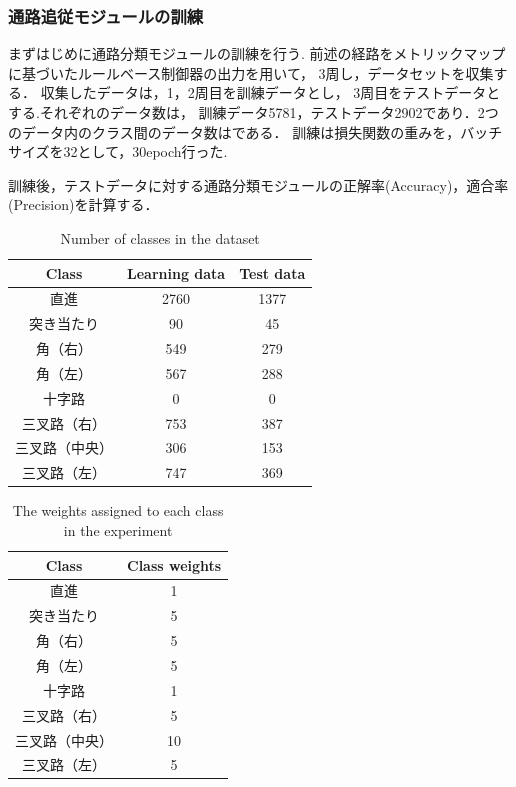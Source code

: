 \clearpage
\subsubsection{通路追従モジュールの訓練}
まずはじめに通路分類モジュールの訓練を行う.
前述の経路をメトリックマップに基づいたルールベース制御器の出力を用いて，
3周し，データセットを収集する．
収集したデータは，1，2周目を訓練データとし，
3周目をテストデータとする.それぞれのデータ数は，
訓練データ5781，テストデータ2902であり．2つのデータ内のクラス間のデータ数はである．
訓練は損失関数の重みを，バッチサイズを32として，30epoch行った.

訓練後，テストデータに対する通路分類モジュールの正解率{(Accuracy)}，適合率{(Precision)}を計算する．
\begin{table}[htbp]
    \centering
    \caption{Number of classes in the dataset}\label{tab:dataset}
    \begin{tabular}{c|c|c}
    \hline
    Class & Learning data &Test data        \\
    \hline
    直進   & 2760 & 1377\\
    突き当たり   & 90 & 45 \\
    角（右） & 549 & 279 \\
    角（左）& 567 & 288 \\
    十字路 & 0 & 0 \\
    三叉路（右）& 753 & 387 \\
    三叉路（中央）& 306 & 153 \\
    三叉路（左） & 747 & 369 \\
    \hline
    \end{tabular}
\end{table}

\begin{table}[htbp]
    \centering
    \caption{The weights assigned to each class in the experiment}\label{tab:cost}
    \begin{tabular}{c|c}
    \hline
    Class & Class weights         \\
    \hline
    直進   & 1\\
    突き当たり   & 5\\
    角（右） & 5\\
    角（左）& 5 \\
    十字路 & 1  \\
    三叉路（右）& 5  \\
    三叉路（中央）& 10  \\
    三叉路（左） & 5  \\
    \hline
    \end{tabular}
\end{table}
